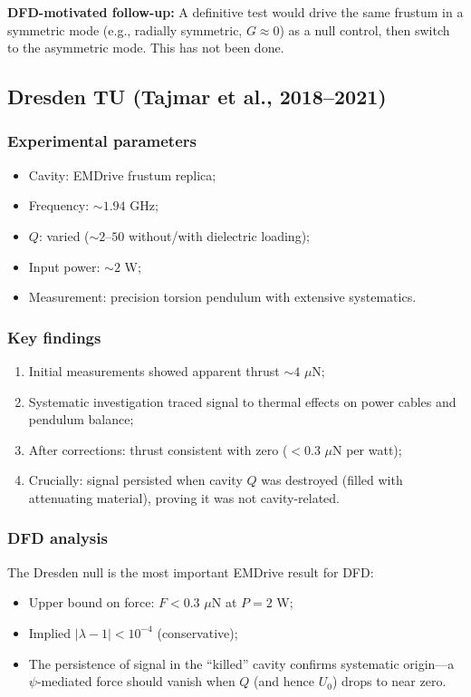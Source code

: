 \documentclass[12pt,letterpaper]{article}
\begin{document}
\textbf{DFD-motivated follow-up:}
A definitive test would drive the same frustum in a symmetric mode
(e.g., radially symmetric, $G \approx 0$) as a null control, then
switch to the asymmetric mode.  This has not been done.

\subsection{Dresden TU (Tajmar et al., 2018--2021)}

\subsubsection{Experimental parameters}
\begin{itemize}[noitemsep]
  \item Cavity: EMDrive frustum replica;
  \item Frequency: $\sim 1.94$ GHz;
  \item $Q$: varied ($\sim 2$--$50$ without/with dielectric loading);
  \item Input power: $\sim 2$ W;
  \item Measurement: precision torsion pendulum with extensive systematics.
\end{itemize}

\subsubsection{Key findings}
\begin{enumerate}[noitemsep]
  \item Initial measurements showed apparent thrust $\sim 4$ $\mu$N;
  \item Systematic investigation traced signal to thermal effects on
    power cables and pendulum balance;
  \item After corrections: thrust consistent with zero
    ($< 0.3$ $\mu$N per watt);
  \item Crucially: signal persisted when cavity $Q$ was destroyed
    (filled with attenuating material), proving it was not
    cavity-related.
\end{enumerate}

\subsubsection{DFD analysis}

The Dresden null is the most important EMDrive result for DFD:
\begin{itemize}[noitemsep]
  \item Upper bound on force: $F < 0.3$ $\mu$N at $P = 2$ W;
  \item Implied $|\lambda - 1| < 10^{-4}$ (conservative);
  \item The persistence of signal in the ``killed'' cavity confirms
    systematic origin---a $\psi$-mediated force should vanish when
    $Q$ (and hence $U_0$) drops to near zero.
\end{itemize}
\end{document}
